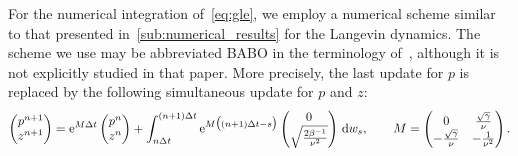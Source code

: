 \documentclass[11pt,a4paper]{article}
\begin{document}
For the numerical integration of~\eqref{eq:gle},
we employ a numerical scheme similar to that presented in~\cref{sub:numerical_results} for the Langevin dynamics.
The scheme we use may be abbreviated BABO in the terminology of~\cite{MR4379630},
although it is not explicitly studied in that paper.
More precisely, the last update for $p$ is replaced by the following simultaneous update for $p$ and $z$:
\[
    \begin{pmatrix}
        p^{n+1} \\
        z^{n+1}
    \end{pmatrix}
    =
    \mathrm{e}^{M \Delta t}
    \begin{pmatrix}
        p^{n} \\
        z^{n}
    \end{pmatrix}
    + \int_{n \Delta t}^{(n+1)\Delta t} \mathrm{e}^{M \bigl((n+1) \Delta t - s\bigr)}
    \begin{pmatrix}
        0 \\
        \sqrt{\frac{2 \beta^{-1}}{\nu^2}}
    \end{pmatrix}
    \, \mathrm d w_s,
    \qquad M =
    \begin{pmatrix}
        0 & \frac{\sqrt{\gamma}}{\nu} \\
        - \frac{\sqrt{\gamma}}{\nu} & -   \frac{1}{\nu^2}
    \end{pmatrix}.
\]
\end{document}
